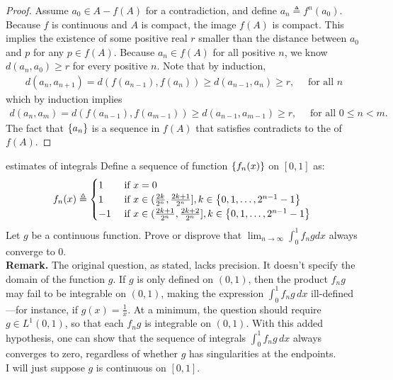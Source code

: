 \documentclass{report}
\begin{document}
\begin{proof}
Assume $a_0 \in A - f(A)$ for a contradiction, and define    $a_n\triangleq f^n(a_0)$. Because $f$ is continuous and $A$ is compact, the image $f(A)$ is compact. This implies the existence of some positive real $r$ smaller than the distance between $a_0$ and  $p$ for any  $p \in f(A)$. Because $a_n \in f(A)$ for all positive $n$, we know $d(a_n,a_0)\geq r$ for every positive $n$. Note that by induction, 
\begin{align*}
d(a_n,a_{n+1})=d(f(a_{n-1}),f(a_n))\geq d(a_{n-1},a_n)\geq r, \quad \text{ for all }n
\end{align*}
which by induction implies 
\begin{align}
\label{dan}
d(a_n,a_m)=d(f(a_{n-1}),f(a_{m-1}))\geq d(a_{n-1},a_{m-1})\geq r,\quad \text{ for all }0\leq n <m. 
\end{align}
The fact that $\left\{ a_n \right\}$ is a sequence in $f(A)$ that satisfies  contradicts to the  of $f(A)$.  
\end{proof}
\begin{question}{estimates of integrals}{}
Define a sequence of function $\left\{ f_n(x) \right\}$ on $[0,1]$ as: 
\begin{align*}
f_n(x)\triangleq \begin{cases}
  1& \text{ if $x=0$ }\\
  1& \text{ if $x\in (\frac{2k}{2^n}, \frac{2k+1}{2^n}],k \in \left\{ 0,1,\dots ,2^{n-1}-1 \right\}$ }\\
  -1& \text{ if $x\in (\frac{2k+1}{2^n},\frac{2k+2}{2^n}],k \in \left\{ 0,1,\dots ,2^{n-1}-1 \right\}$ }
\end{cases}
\end{align*}
Let  $g$ be a continuous function. Prove or disprove that $\lim_{n\to \infty} \int_{0}^1 f_ngdx$ always converge to $0$.  \\


\textbf{Remark.} The original question, as stated, lacks precision. It doesn't specify the domain of the function \( g \). If \( g \) is only defined on \( (0,1) \), then the product \( f_n g \) may fail to be integrable on $(0,1)$, making the expression \( \int_0^1 f_n g \, dx \) ill-defined—for instance, if \( g(x) = \frac{1}{x} \). At a minimum, the question should require \( g \in L^1(0,1) \), so that each \( f_n g \) is integrable on \( (0,1) \). With this added hypothesis, one can show that the sequence of integrals \( \int_0^1 f_n g \, dx \) always converges to zero, regardless of whether \( g \) has singularities at the endpoints. \\

I will just suppose $g$ is continuous on  $[0,1]$. 
\end{question}
\end{document}
